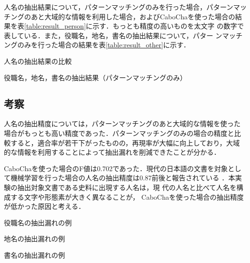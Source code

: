 \documentclass[japanese]{jnlp_1.4}
\begin{document}
人名の抽出結果について，パターンマッチングのみを行った場合，パターンマッ
チングのあと大域的な情報を利用した場合，およびCaboChaを使った場合の結
果を表\ref{table:result_person}に示す．もっとも精度の高いものを太文字
の数字で表している．また，役職名，地名，書名の抽出結果について，パター
ンマッチングのみを行った場合の結果を表\ref{table:result_other}に示す．

\begin{table}[b]
\caption{人名の抽出結果の比較}
\label{table:result_person}
\begin{center}

\end{center}
\end{table}
\begin{table}[b]
\caption{役職名，地名，書名の抽出結果（パターンマッチングのみ）}
\label{table:result_other}
\begin{center}

\end{center}
\end{table}


\subsection{考察}

人名の抽出精度については，パターンマッチングのあと大域的な情報を使った
場合がもっとも高い精度であった．パターンマッチングのみの場合の精度と比
較すると，適合率が若干下がったものの，再現率が大幅に向上しており，大域
的な情報を利用することによって抽出漏れを削減できたことが分かる．

CaboChaを使った場合のF値は0.702であった．現代の日本語の文書を対象とし
て機械学習を行った場合の人名の抽出精度は0.87前後と報告されている
\cite{asahara2003}．本実験の抽出対象文書である史料に出現する人名は，現
代の人名と比べて人名を構成する文字や形態素が大きく異なることが，
CaboChaを使った場合の抽出精度が低かった原因と考える．

\begin{table}[t]
\caption{役職名の抽出漏れの例}
\label{table:loss_position}
\begin{center}

\end{center}
\end{table}
\begin{table}[t]
\caption{地名の抽出漏れの例}
\label{table:loss_place}
\begin{center}

\end{center}
\end{table}
\begin{table}[t]
\caption{書名の抽出漏れの例}
\label{table:loss_book}
\begin{center}

\end{center}
\end{table}
\end{document}
